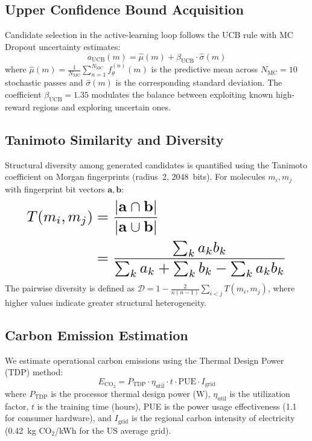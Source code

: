 \documentclass[twocolumn,10pt]{article}
\begin{document}
\subsection{Upper Confidence Bound Acquisition}

Candidate selection in the active-learning loop follows the UCB rule with MC Dropout
uncertainty estimates:
\begin{equation}
a_\text{UCB}(m) = \hat{\mu}(m) + \beta_\text{UCB} \cdot \hat{\sigma}(m)
\label{eq:ucb}
\end{equation}
where $\hat{\mu}(m) = \frac{1}{N_\text{MC}} \sum_{n=1}^{N_\text{MC}} f_\theta^{(n)}(m)$ is the
predictive mean across $N_\text{MC} = 10$ stochastic passes and $\hat{\sigma}(m)$ is the
corresponding standard deviation. The coefficient $\beta_\text{UCB} = 1.35$ modulates the
balance between exploiting known high-reward regions and exploring uncertain ones.

\subsection{Tanimoto Similarity and Diversity}

Structural diversity among generated candidates is quantified using the Tanimoto coefficient on Morgan fingerprints (radius~2, 2048~bits). For molecules $m_i, m_j$ with fingerprint bit vectors $\mathbf{a}, \mathbf{b}$:
\begin{equation}
\resizebox{0.89\linewidth}{!}{$
\begin{aligned}
T(m_i, m_j) &= \frac{|\mathbf{a} \cap \mathbf{b}|}{|\mathbf{a} \cup \mathbf{b}|} \\
&= \frac{\sum_k a_k b_k}{\sum_k a_k + \sum_k b_k - \sum_k a_k b_k}
\end{aligned}
$}
\label{eq:tanimoto}
\end{equation}
The pairwise diversity is defined as $\mathcal{D} = 1 - \frac{2}{n(n-1)} \sum_{i<j} T(m_i, m_j)$, where higher values indicate greater structural heterogeneity.

\subsection{Carbon Emission Estimation}

We estimate operational carbon emissions using the Thermal Design Power (TDP) method:
\begin{equation}
E_{\text{CO}_2} = P_{\text{TDP}} \cdot \eta_{\text{util}} \cdot t \cdot \text{PUE} \cdot I_{\text{grid}}
\label{eq:carbon}
\end{equation}
where $P_\text{TDP}$ is the processor thermal design power (W), $\eta_\text{util}$ is the utilization factor, $t$ is the training time (hours), PUE is the power usage effectiveness (1.1 for consumer hardware), and $I_\text{grid}$ is the regional carbon intensity of electricity (0.42~kg CO$_2$/kWh for the US average grid).
\end{document}
